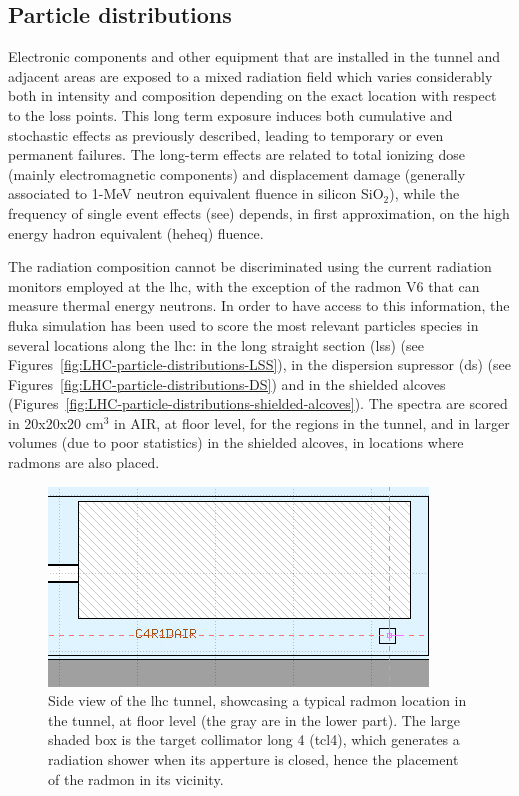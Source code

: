 \documentclass[encoding=utf8,british]{tumphthesis}
\begin{document}
\subsection{Particle distributions}
\label{section:LHC-spectrum}

Electronic components and other equipment that are installed in the tunnel and adjacent areas are exposed to a mixed radiation field which varies considerably both in intensity and composition depending on the exact location with respect to the loss points.  This long term exposure induces both cumulative and stochastic effects as previously described, leading to temporary or even permanent failures. The long-term effects are related to total ionizing dose (mainly electromagnetic components) and displacement damage (generally associated to 1-MeV neutron equivalent fluence in silicon SiO$_2$), while the frequency of single event effects (\acrshort{see}) depends, in first approximation, on the high energy hadron equivalent (\acrshort{heheq}) fluence. 

The radiation composition cannot be discriminated using the current radiation monitors employed at the \acrshort{lhc}, with the exception of the \acrshort{radmon} V6 that can measure thermal energy neutrons. In order to have access to this information, the \acrshort{fluka} simulation has been used to score the most relevant particles species in several locations along the \acrshort{lhc}: in the long straight section (\acrshort{lss}) (see Figures~\ref{fig:LHC-particle-distributions-LSS}), in the dispersion supressor (\acrshort{ds}) (see Figures~\ref{fig:LHC-particle-distributions-DS}) and in the shielded alcoves  (Figures~\ref{fig:LHC-particle-distributions-shielded-alcoves}). The spectra are scored in 20x20x20 cm$^3$ in AIR, at floor level, for the regions in the tunnel, and in larger volumes (due to poor statistics) in the shielded alcoves, in locations where \acrshort{radmon}s are also placed.

\begin{figure}[H]
    \centering 
  \includegraphics[width=0.6\linewidth]{figures/RadMON-location.png}
  \caption{Side view of the \acrshort{lhc} tunnel, showcasing a typical \acrshort{radmon} location in the tunnel, at floor level (the gray are in the lower part). The large shaded box is the target collimator long 4 (\acrshort{tcl}4), which generates a radiation shower when its apperture is closed, hence the placement of the \acrshort{radmon} in its vicinity. }
  \label{fig:RadMON-location}
\end{figure}
\end{document}
